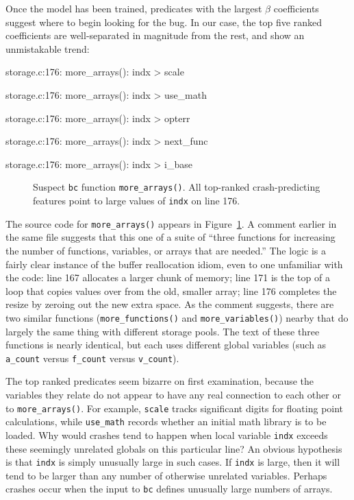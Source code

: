 Once the model has been trained, predicates with the largest $\beta$
coefficients suggest where to begin looking for the bug.  In our case,
the top five ranked coefficients are well-separated in magnitude from
the rest, and show an unmistakable trend:

\begin{features}
\item storage.c:176: more\_arrays(): indx > scale
\item storage.c:176: more\_arrays(): indx > use\_math
\item storage.c:176: more\_arrays(): indx > opterr
\item storage.c:176: more\_arrays(): indx > next\_func
\item storage.c:176: more\_arrays(): indx > i\_base
\end{features}

\begin{figure}
  \centering
  \caption{Suspect \texttt{bc} function \texttt{more\_arrays()}.  All
  top-ranked crash-predicting features point to large values of
  \texttt{indx} on line 176.}
  \label{fig:bc:more-arrays}
\end{figure}

The source code for \texttt{more\_arrays()} appears in
Figure~\ref{fig:bc:more-arrays}.  A comment earlier in the same file
suggests that this one of a suite of ``three functions for increasing
the number of functions, variables, or arrays that are needed.''  The
logic is a fairly clear instance of the buffer reallocation idiom,
even to one unfamiliar with the code: line 167 allocates a larger
chunk of memory; line 171 is the top of a loop that copies values over
from the old, smaller array; line 176 completes the resize by zeroing
out the new extra space.  As the comment suggests, there are two
similar functions (\texttt{more\_functions()} and
\texttt{more\_variables()}) nearby that do largely the same thing with
different storage pools.  The text of these three functions is nearly
identical, but each uses different global variables (such as
\texttt{a\_count} versus \texttt{f\_count} versus \texttt{v\_count}).

The top ranked predicates seem bizarre on first examination, because the
variables they relate do not appear to have any real connection to
each other or to \texttt{more\_arrays()}.  For example, \texttt{scale}
tracks significant digits for floating point calculations, while
\texttt{use\_math} records whether an initial math library is to be
loaded.  Why would crashes tend to happen when local variable
\texttt{indx} exceeds these seemingly unrelated globals on this
particular line?  An obvious hypothesis is that \texttt{indx} is
simply unusually large in such cases.  If \texttt{indx} is large, then
it will tend to be larger than any number of otherwise unrelated
variables.  Perhaps crashes occur when the input to \texttt{bc}
defines unusually large numbers of arrays.


